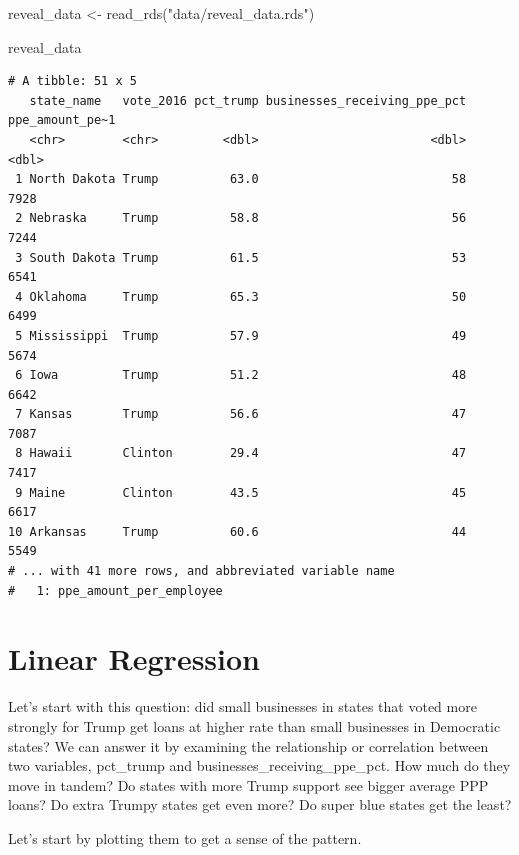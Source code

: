 \documentclass[
  letterpaper,
  DIV=11,
  numbers=noendperiod]{scrreprt}
\newenvironment{Shaded}{\begin{snugshade}}{\end{snugshade}}
\newcommand{\FunctionTok}[1]{\textcolor[rgb]{0.28,0.35,0.67}{#1}}
\newcommand{\NormalTok}[1]{\textcolor[rgb]{0.00,0.23,0.31}{#1}}
\newcommand{\OtherTok}[1]{\textcolor[rgb]{0.00,0.23,0.31}{#1}}
\newcommand{\StringTok}[1]{\textcolor[rgb]{0.13,0.47,0.30}{#1}}
\begin{document}
\begin{Shaded}
\begin{Highlighting}[]
\NormalTok{reveal\_data }\OtherTok{\textless{}{-}} \FunctionTok{read\_rds}\NormalTok{(}\StringTok{"data/reveal\_data.rds"}\NormalTok{)}

\NormalTok{reveal\_data}
\end{Highlighting}
\end{Shaded}

\begin{verbatim}
# A tibble: 51 x 5
   state_name   vote_2016 pct_trump businesses_receiving_ppe_pct ppe_amount_pe~1
   <chr>        <chr>         <dbl>                        <dbl>           <dbl>
 1 North Dakota Trump          63.0                           58            7928
 2 Nebraska     Trump          58.8                           56            7244
 3 South Dakota Trump          61.5                           53            6541
 4 Oklahoma     Trump          65.3                           50            6499
 5 Mississippi  Trump          57.9                           49            5674
 6 Iowa         Trump          51.2                           48            6642
 7 Kansas       Trump          56.6                           47            7087
 8 Hawaii       Clinton        29.4                           47            7417
 9 Maine        Clinton        43.5                           45            6617
10 Arkansas     Trump          60.6                           44            5549
# ... with 41 more rows, and abbreviated variable name
#   1: ppe_amount_per_employee
\end{verbatim}


\hypertarget{linear-regression}{%
\chapter{Linear Regression}\label{linear-regression}}

Let's start with this question: did small businesses in states that
voted more strongly for Trump get loans at higher rate than small
businesses in Democratic states? We can answer it by examining the
relationship or correlation between two variables, pct\_trump and
businesses\_receiving\_ppe\_pct. How much do they move in tandem? Do
states with more Trump support see bigger average PPP loans? Do extra
Trumpy states get even more? Do super blue states get the least?

Let's start by plotting them to get a sense of the pattern.
\end{document}

